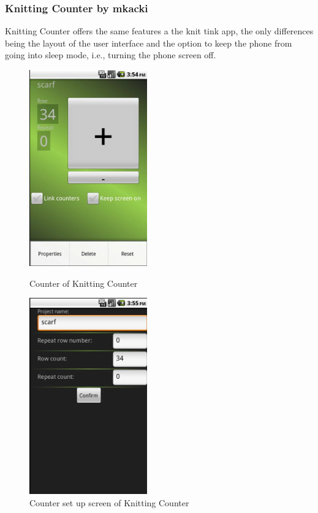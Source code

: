 \subsubsection*{Knitting Counter by mkacki}
Knitting Counter offers the same features a the knit tink app, the only differences being the layout of the user interface and the option to keep the phone from going into sleep mode, i.e., turning the phone screen off.

\begin{figure}[H]
\centering
\begin{minipage}{.5\textwidth}
  \centering
  \includegraphics[width=2in]{images/image12.png}
  \caption[Counter of Knitting Counter ]{Counter of Knitting Counter}
  \label{fig_knittingcounter1}
\end{minipage}%
\begin{minipage}{.5\textwidth}
  \centering
  \includegraphics[width=2in]{images/image06.png}
  \caption[Counter set up screen of Knitting Counter ] {Counter set up screen of Knitting Counter}
  \label{fig_knittingcounter2}
\end{minipage}
\end{figure}

